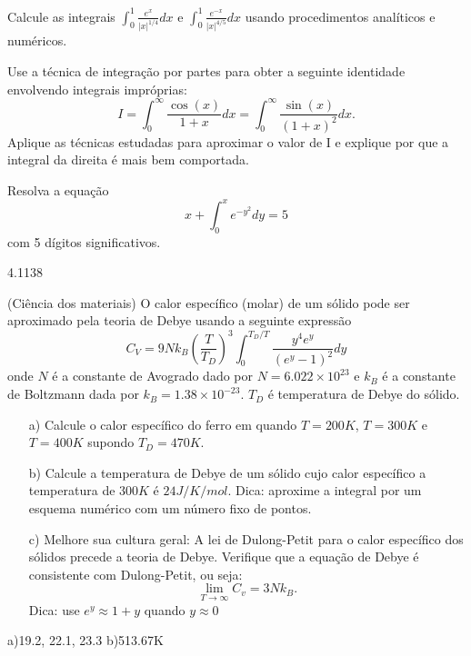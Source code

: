 \begin{exer}Calcule as integrais $\int_0^{1}\frac{e^x}{|x|^{1/4}}dx$ e $\int_0^1\frac{e^{-x}}{|x|^{4/5}}dx$ usando procedimentos analíticos e numéricos.
\end{exer}

\begin{exer} Use a técnica de integração por partes para obter a seguinte identidade envolvendo integrais impróprias:
$$I=\int_0^\infty \frac{\cos(x)}{1+x}dx =\int_0^\infty \frac{\sin(x)}{(1+x)^2}dx.$$
Aplique as técnicas estudadas para aproximar o valor de I e explique por que a integral da direita é mais bem comportada.
\end{exer}

\begin{exer} Resolva a  equação
$$x+\int_0^x e^{-y^2}dy=5$$
com 5 dígitos significativos.
\end{exer}
\begin{resp}
  
4.1138    
  
\end{resp}

\begin{exer}(Ciência dos materiais) O calor específico (molar) de um sólido pode ser aproximado pela teoria de Debye usando a seguinte expressão
$$C_V=9Nk_B\left(\frac{T}{T_D}\right)^3\int_0^{T_D/T} \frac{y^4e^y}{(e^y-1)^2}dy$$
onde $N$ é a constante de Avogrado dado por $N=6.022\times 10^{23}$ e $k_B$ é a constante de Boltzmann dada por $k_B=1.38\times 10^{-23}$. $T_D$ é temperatura de Debye do sólido.
\begin{itemize}
\item[a)] Calcule o calor específico do ferro em quando $T=200K$, $T=300K$ e $T=400K$ supondo $T_D=470K$.
\item[b)] Calcule a temperatura de Debye de um sólido cujo calor específico a temperatura de $300K$ é $24J/K/mol$. Dica: aproxime a integral por um esquema numérico com um número fixo de pontos.
\item[c)] Melhore sua cultura geral: A lei de Dulong-Petit para o calor específico dos sólidos precede a teoria de Debye. Verifique que a equação de Debye é consistente com Dulong-Petit, ou seja: $$\lim_{T\to \infty}C_v=3Nk_B.$$ Dica: use $e^y\approx 1+y$ quando $y\approx 0$
\end{itemize}

\end{exer}
\begin{resp}
  
a)19.2, 22.1, 23.3 b)513.67K    
  
\end{resp}

